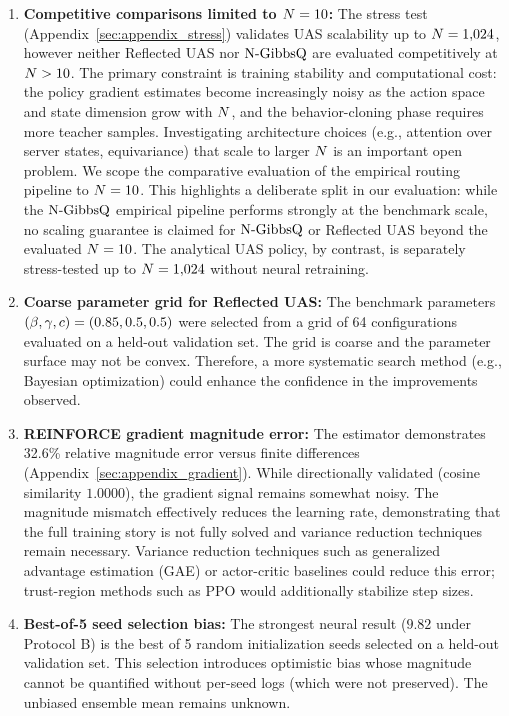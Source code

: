\begin{enumerate}[label=\textbf{L\arabic*.}, leftmargin=2.2em]
\item \textbf{Competitive comparisons limited to $N = 10$:}
The stress test (Appendix~\ref{sec:appendix_stress}) validates UAS scalability up to $N = 1{,}024$, however neither Reflected UAS nor $\text{N-GibbsQ}$ are evaluated competitively at $N > 10$. The primary constraint is training stability and computational cost: the \reinforce{} policy gradient estimates become increasingly noisy as the action space and state dimension grow with $N$, and the behavior-cloning phase requires more teacher samples. Investigating architecture choices (e.g., attention over server states, equivariance) that scale to larger $N$ is an important open problem.
We scope the comparative evaluation of the empirical routing pipeline to $N = 10$. This highlights a deliberate split in our evaluation: while the $\text{N-GibbsQ}$ empirical pipeline performs strongly at the benchmark scale, no scaling guarantee is claimed for $\text{N-GibbsQ}$ or Reflected UAS beyond the evaluated $N=10$. The analytical UAS policy, by contrast, is separately stress-tested up to $N = 1{,}024$ without neural retraining.

\item \textbf{Coarse parameter grid for Reflected UAS:}
The benchmark parameters $(\beta, \gamma, c) = (0.85, 0.5, 0.5)$ were selected from a grid of 64 configurations evaluated on a held-out validation set.
The grid is coarse and the parameter surface may not be convex.
Therefore, a more systematic search method (e.g., Bayesian optimization) could enhance the confidence in the improvements observed.

\item \textbf{REINFORCE gradient magnitude error:}
The \reinforce{} estimator demonstrates 32.6\% relative magnitude error versus finite differences (Appendix~\ref{sec:appendix_gradient}).
While directionally validated (cosine similarity $1.0000$), the gradient signal remains somewhat noisy. The magnitude mismatch effectively reduces the learning rate, demonstrating that the full \reinforce{} training story is not fully solved and variance reduction techniques remain necessary.
Variance reduction techniques such as generalized advantage estimation (GAE) or actor-critic baselines could reduce this error; trust-region methods such as PPO would additionally stabilize step sizes.

\item \textbf{Best-of-5 seed selection bias:}
The strongest neural result ($9.82$ under Protocol B) is the best of 5 random initialization seeds selected on a held-out validation set.
This selection introduces optimistic bias whose magnitude cannot be quantified without per-seed logs (which were not preserved).
The unbiased ensemble mean remains unknown.


\end{enumerate}
